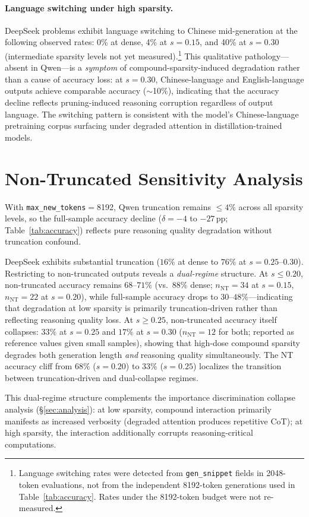 \paragraph{Language switching under high sparsity.}
DeepSeek problems exhibit language switching to Chinese mid-generation at the following observed rates: 0\% at dense, 4\% at $s{=}0.15$, and 40\% at $s{=}0.30$ (intermediate sparsity levels not yet measured).\footnote{Language switching rates were detected from \texttt{gen\_snippet} fields in 2048-token evaluations, not from the independent 8192-token generations used in Table~\ref{tab:accuracy}. Rates under the 8192-token budget were not re-measured.} This qualitative pathology---absent in Qwen---is a \emph{symptom} of compound-sparsity-induced degradation rather than a cause of accuracy loss: at $s{=}0.30$, Chinese-language and English-language outputs achieve comparable accuracy ($\sim$10\%), indicating that the accuracy decline reflects pruning-induced reasoning corruption regardless of output language. The switching pattern is consistent with the model's Chinese-language pretraining corpus surfacing under degraded attention in distillation-trained models.


\section{Non-Truncated Sensitivity Analysis}
\label{app:accuracy-nt}

With \texttt{max\_new\_tokens}${=}$8192, Qwen truncation remains $\leq 4\%$ across all sparsity levels, so the full-sample accuracy decline ($\delta{=}-4$ to $-27$\,pp; Table~\ref{tab:accuracy}) reflects pure reasoning quality degradation without truncation confound.

DeepSeek exhibits substantial truncation ($16\%$ at dense to $76\%$ at $s{=}0.25$--$0.30$). Restricting to non-truncated outputs reveals a \emph{dual-regime} structure. At $s \leq 0.20$, non-truncated accuracy remains $68$--$71\%$ (vs.\ $88\%$ dense; $n_{\text{NT}}{=}34$ at $s{=}0.15$, $n_{\text{NT}}{=}22$ at $s{=}0.20$), while full-sample accuracy drops to $30$--$48\%$---indicating that degradation at low sparsity is primarily truncation-driven rather than reflecting reasoning quality loss. At $s \geq 0.25$, non-truncated accuracy itself collapses: $33\%$ at $s{=}0.25$ and $17\%$ at $s{=}0.30$ ($n_{\text{NT}}{=}12$ for both; reported as reference values given small samples), showing that high-dose compound sparsity degrades both generation length \emph{and} reasoning quality simultaneously. The NT accuracy cliff from $68\%$ ($s{=}0.20$) to $33\%$ ($s{=}0.25$) localizes the transition between truncation-driven and dual-collapse regimes.

This dual-regime structure complements the importance discrimination collapse analysis (\S\ref{sec:analysis}): at low sparsity, compound interaction primarily manifests as increased verbosity (degraded attention produces repetitive CoT); at high sparsity, the interaction additionally corrupts reasoning-critical computations.
